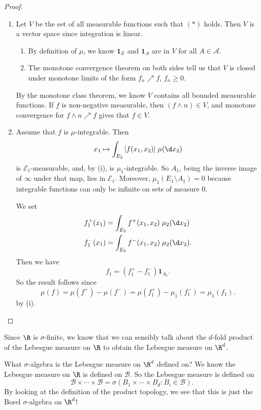 \documentclass[a4paper]{article}
\begin{document}
\begin{proof}\leavevmode
  \begin{enumerate}
    \item Let $V$ be the set of all measurable functions such that $(*)$ holds. Then $V$ is a vector space since integration is linear.
      \begin{enumerate}
        \item By definition of $\mu$, we know $\mathbf{1}_E$ and $\mathbf{1}_A$ are in $V$ for all $A \in \mathcal{A}$.
        \item The monotone convergence theorem on both sides tell us that $V$ is closed under monotone limits of the form $f_n \nearrow f$, $f_n \geq 0$.
      \end{enumerate}
      By the monotone class theorem, we know $V$ contains all bounded measurable functions. If $f$ is non-negative measurable, then $(f \wedge n) \in V$, and monotone convergence for $f \wedge n \nearrow f$ gives that $f \in V$.
    \item Assume that $f$ is $\mu$-integrable. Then
      \[
        x_1 \mapsto \int_{E_2} |f(x_1, x_2)|\;\mu(\d x_2)
      \]
      is $\mathcal{E}_1$-measurable, and, by (i), is $\mu_1$-integrable. So $A_1$, being the inverse image of $\infty$ under that map, lies in $\mathcal{E}_1$. Moreover, $\mu_1(E_1 \setminus A_1) = 0$ because integrable functions can only be infinite on sets of measure $0$.

      We set
      \begin{align*}
        f_1^+(x_1) &= \int_{E_2} f^+(x_1, x_2)\;\mu_2(\d x_2)\\
        f_1^-(x_1) &= \int_{E_2} f^-(x_1, x_2)\;\mu_2(\d x_2).
      \end{align*}
      Then we have
      \[
        f_1 = (f_1^+ - f_1^-) \mathbf{1}_{A_1}.
      \]
      So the result follows since
      \[
        \mu(f) = \mu(f^+) - \mu(f^-) = \mu(f_1^+) - \mu_1(f_1^-) = \mu_1(f_1).
      \]
      by (i).
  \end{enumerate}
\end{proof}

Since $\R$ is $\sigma$-finite, we know that we can sensibly talk about the $d$-fold product of the Lebesgue measure on $\R$ to obtain the Lebesgue measure on $\R^d$.

What $\sigma$-algebra is the Lebesgue measure on $\R^d$ defined on? We know the Lebesgue measure on $\R$ is defined on $\mathcal{B}$. So the Lebesgue measure is defined on
\[
  \mathcal{B} \times \cdots \times \mathcal{B} = \sigma(B_1 \times \cdots \times B_d: B_i \in \mathcal{B}).
\]
By looking at the definition of the product topology, we see that this is just the Borel $\sigma$-algebra on $\R^d$!
\end{document}
